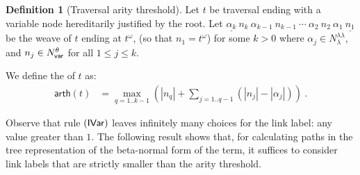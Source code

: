 \documentclass{article}
\theoremstyle{definition}
\newtheorem{definition}{Definition}[section]
\newcommand\NodesVar{N_{\sf var}}%
\newcommand\NodesLmd{N_\lambda}%
\newcommand{\ghostlmd}{{\lambda\!\!\lambda}}
\newcommand{\ghostvar}{\theta}
\newcommand\arth{\textsf{arth}}
\begin{document}
\begin{definition}[Traversal arity threshold]
\label{dfn:arity-threshold}
Let $t$ be traversal ending with a variable node hereditarily justified by the root.
Let $\underline{\alpha_k}\ n_k\ \alpha_{k-1}\ n_{k-1}\ \cdots\ \alpha_2\ n_2\ \alpha_1\ \underline{n_1}$ be the weave of $t$ ending at $t^\omega$, (so that $n_1 = t^\omega$) for some $k>0$  where $\alpha_j \in \NodesLmd^\ghostlmd$, and $n_j \in \NodesVar^\ghostvar$ for all $1\leq j\leq k$.

We define the  of $t$ as:
\begin{align*}
\arth(t) &= \max_{q=1..k-1} \left( |n_q| + \sum_{j=1..q-1} (|n_j| - |\alpha_j|) \right)\ .
\end{align*}
\end{definition}

Observe that rule $\mathbf{({\sf IVar})}$ leaves infinitely many choices for the link label: any value greater than $1$. The following result shows that, for calculating paths in the tree representation of the beta-normal form of the term, it suffices to consider link labels that are strictly smaller than the arity threshold.
\end{document}
